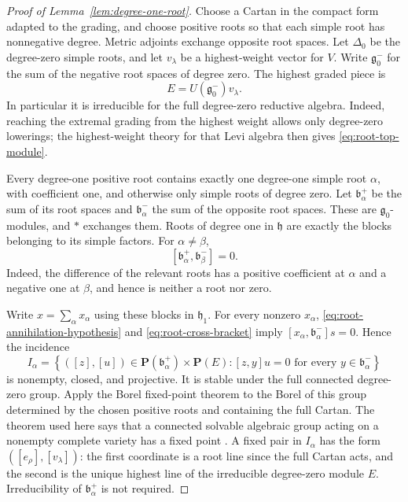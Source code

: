 \begin{proof}[Proof of Lemma~\ref{lem:degree-one-root}]
Choose a Cartan in the compact form adapted to the grading,
and choose positive roots so that each simple root has
nonnegative degree.  Metric adjoints exchange opposite
root spaces.  Let $\Delta_0$ be the degree-zero simple
roots, and let $v_\lambda$ be a highest-weight vector
for $V$.  Write $\mathfrak g_0^-$ for the sum of the
negative root spaces of degree zero.  The highest graded piece is
\begin{equation}\label{eq:root-top-module}
                  E=U(\mathfrak g_0^-)v_\lambda.
\end{equation}
In particular it is irreducible for the full degree-zero
reductive algebra.  Indeed, reaching the extremal grading
from the highest weight allows only degree-zero
lowerings; the highest-weight theory for that Levi
algebra then gives \eqref{eq:root-top-module}.

Every degree-one positive root contains exactly one
degree-one simple root $\alpha$, with coefficient one,
and otherwise only simple roots of degree zero.  Let
$\mathfrak b^+_\alpha$ be the sum of its root spaces and
$\mathfrak b^-_\alpha$ the sum of the opposite root
spaces.  These are $\mathfrak g_0$-modules, and $*$
exchanges them.  Roots of degree one in $\mathfrak h$
are exactly the blocks belonging to its simple factors.
For $\alpha\ne\beta$,
\begin{equation}\label{eq:root-cross-bracket}
                 [\mathfrak b^+_\alpha,
                         \mathfrak b^-_\beta]=0.
\end{equation}
Indeed, the difference of the relevant roots has a
positive coefficient at $\alpha$ and a negative one at
$\beta$, and hence is neither a root nor zero.

Write $x=\sum_\alpha x_\alpha$ using these blocks in
$\mathfrak h_1$.  For every nonzero $x_\alpha$,
\eqref{eq:root-annihilation-hypothesis} and
\eqref{eq:root-cross-bracket} imply
$[x_\alpha,\mathfrak b^-_\alpha]s=0$.  Hence the incidence
\[
 I_\alpha=
 \left\{([z],[u])\in
  \mathbf P(\mathfrak b^+_\alpha)\times\mathbf P(E):
             [z,y]u=0\text{ for every }y\in\mathfrak b^-_\alpha\right\}
\]
is nonempty, closed, and projective.  It is stable under
the full connected degree-zero group.  Apply the Borel
fixed-point theorem to the Borel of this group determined
by the chosen positive roots and containing the full Cartan.
The theorem used here says that a
connected solvable algebraic group acting on a nonempty
complete variety has a fixed point
\cite[Corollary~17.3]{Milne}.  A fixed pair in $I_\alpha$
has the form $([e_\rho],[v_\lambda])$: the first
coordinate is a root line since the full Cartan acts,
and the second is the unique highest line of the
irreducible degree-zero module $E$.  Irreducibility of
$\mathfrak b^+_\alpha$ is not required.


\end{proof}
